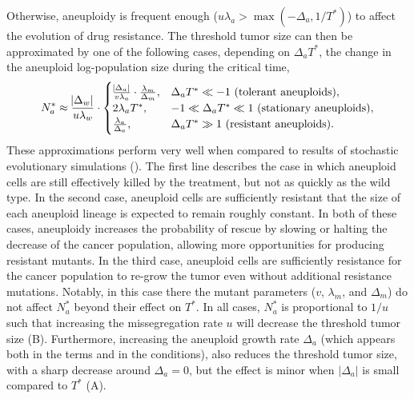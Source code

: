\documentclass[12pt]{extarticle}
\begin{document}
Otherwise, aneuploidy is frequent enough ($u\lambda_a > \max{\left(-\Delta_a, 1/T^*\right)}$) to affect the evolution of drug resistance. 
The threshold tumor size can then be approximated by one of the following cases, depending on $\Delta_a T^*$, the change in the aneuploid log-population size during the critical time,
\begin{equation}  \label{eq:N_a}
\begin{aligned}
N_a^* \approx 
  \frac{\abs{\Delta_w}}{u\lambda_w} \cdot \begin{cases}
    \frac{\abs{\Delta_a}}{v\lambda_a} \cdot \frac{\lambda_m}{\Delta_m} ,&
  \Delta_a T^* \ll -1 \text{ (tolerant aneuploids)},\\ 
  2\lambda_a T^* ,&
  -1 \ll \Delta_a T^* \ll 1  \text{ (stationary aneuploids)},\\ 
  \frac{\lambda_a}{\Delta_a} ,&
   \Delta_a T^* \gg 1 \text{ (resistant aneuploids)}.
  \end{cases}
\end{aligned}
\end{equation}
These approximations perform very well when compared to results of stochastic evolutionary simulations ().
The first line describes the case in which aneuploid cells are still effectively killed by the treatment, but not as quickly as the wild type. 
In the second case, aneuploid cells are sufficiently resistant that the size of each aneuploid lineage is expected to remain roughly constant.  %
In both of these cases, aneuploidy increases the probability of rescue by slowing or halting the decrease of the cancer population, allowing more opportunities for producing resistant mutants. 
In the third case, aneuploid cells are sufficiently resistance for the cancer population to re-grow the tumor even without additional resistance mutations.
Notably, in this case there the mutant parameters ($v$, $\lambda_m$, and $\Delta_m$) do not affect $N_a^*$ beyond their effect on $T^*$.
In all cases, $N_a^*$ is proportional to $1/u$ such that increasing the missegregation rate $u$ will decrease the threshold tumor size (B).
Furthermore, increasing the aneuploid growth rate $\Delta_a$ (which appears both in the terms and in the conditions), also reduces the threshold tumor size, with a sharp decrease around $\Delta_a=0$, but the effect is minor when $|\Delta_a|$ is small compared to $T^*$ (A).  %
\end{document}
